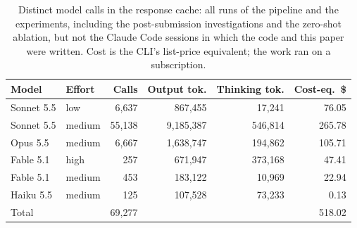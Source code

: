 \begin{table}[t]
\caption{Distinct model calls in the response cache: all runs of the pipeline and the experiments, including the post-submission investigations and the zero-shot ablation, but not the Claude Code sessions in which the code and this paper were written. Cost is the CLI's list-price equivalent; the work ran on a subscription.}
\label{tab:usage}
\centering
\scriptsize
\begin{tabular}{@{}llrrrr@{}}
\toprule
Model & Effort & Calls & Output tok. & Thinking tok. & Cost-eq.\ \$ \\
\midrule
Sonnet 5.5 & low & 6,637 & 867,455 & 17,241 & 76.05 \\
Sonnet 5.5 & medium & 55,138 & 9,185,387 & 546,814 & 265.78 \\
Opus 5.5 & medium & 6,667 & 1,638,747 & 194,862 & 105.71 \\
Fable 5.1 & high & 257 & 671,947 & 373,168 & 47.41 \\
Fable 5.1 & medium & 453 & 183,122 & 10,969 & 22.94 \\
Haiku 5.5 & medium & 125 & 107,528 & 73,233 & 0.13 \\
\midrule
Total & & 69,277 & & & 518.02 \\
\bottomrule
\end{tabular}
\end{table}
